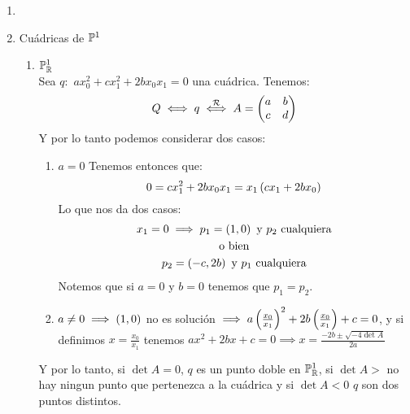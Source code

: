 \begin{example} 
  \begin{enumerate}
   \item []
    \item Cuádricas de $\mathbb{P}^1$
      \begin{enumerate}
        \item $\mathbb{P}^1_{\mathbb{R}}$\\
          Sea $q:$ $ax^{2}_{0} + cx^{2}_{1}+2bx_0x_1=0$ una cuádrica. Tenemos:
          \[
            Q \iff q \stackrel{\mathcal{R}}{\iff}A=
            \begin{pmatrix}
              a & b\\
              c & d\\
            \end{pmatrix}
          \]
          Y por lo tanto podemos considerar dos casos:
          \begin{enumerate}
            \item $a=0$ Tenemos entonces que:
              \[
                0=cx^{2}_{1}+2bx_0x_1 = x_1 \left( cx_1 +2bx_0 \right) 
              \]
              Lo que nos da dos casos:
              \begin{gather*}
                x_1=0 \implies p_1=\left( 1,0\right) \text{ y $p_2$ cualquiera}\\
                \text{o bien}\\
                p_2=\left( -c,2b\right) \text{ y $p_1$ cualquiera}\\
              \end{gather*}
              Notemos que si $a=0$ y $b=0$ tenemos que $p_1=p_2$.

            \item $a\neq 0 \implies \left( 1,0\right)$ no es solución 
              $\implies a\left(\frac{x_0}{x_1}\right) ^2 +2b\left(\frac{x_0}{x_1}\right) +c=0$,
              y si definimos $x=\frac{x_0}{x_1}$ tenemos $ax^2 +2bx+c=0 \implies
              x=\frac{-2b \pm \sqrt{-4\det A}}{2a}$\\
          \end{enumerate}
          Y por lo tanto, si $\det A = 0$, $q$ es un punto doble en $\mathbb{P}^1_{\mathbb{R}}$,
          si $\det A>$ no hay ningun punto que pertenezca a la cuádrica y si 
          $\det A <0$ $q$ son dos puntos distintos.


\end{enumerate}
\end{enumerate}
\end{example}
